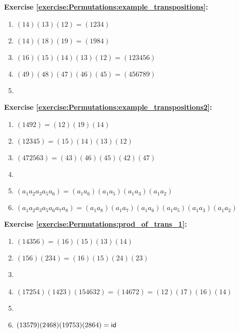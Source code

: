 \noindent\textbf{Exercise \ref{exercise:Permutations:example_transpositions}:}
\begin{enumerate}[{a.}]
\item
$(14)(13)(12) = (1234)$

\item
$(14)(18)(19) = (1984)$

\item
$(16)(15)(14)(13)(12) = (123456)$

\item
$(49)(48)(47)(46)(45) = (456789)$

\item

\end{enumerate}

\noindent\textbf{Exercise \ref{exercise:Permutations:example_transpositions2}:} %
\begin{enumerate}[{a.}]
\item
$(1492) = (12)(19)(14)$

\item
$(12345) = (15)(14)(13)(12)$

\item
$(472563) = (43)(46)(45)(42)(47)$

\item

\item
$(a_1a_2a_3a_5a_6) = (a_1a_6)(a_1a_5)(a_1a_3)(a_1a_2)$

\item
$(a_1 a_2 a_3 a_5 a_6 a_7 a_8) =  (a_1a_8)(a_1a_7)(a_1a_6)(a_1a_5)(a_1a_3)(a_1a_2)$
\end{enumerate}

\noindent\textbf{Exercise \ref{exercise:Permutations:prod_of_trans_1}:} %
\begin{enumerate}[{a.}]
\item
$(14356) = (16)(15)(13)(14)$

\item
$(156)(234) = (16)(15)(24)(23)$

\item

\item
$(17254)(1423)(154632) = (14672) = (12)(17)(16)(14)$

\item

\item
$( 1 3 5 7 9 )(2 4 6 8 ) (1 9 7 5 3) (2 8 6 4) = \sf{id}$
\end{enumerate}

